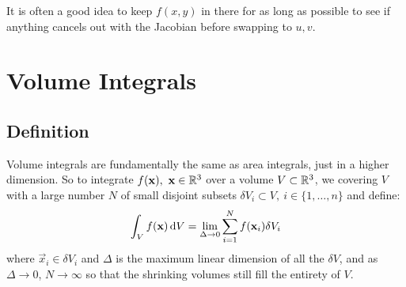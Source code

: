 \documentclass[../main.tex]{subfiles}
\begin{document}
\begin{remark}[Advice]
  It is often a good idea to keep $f(x, y)$ in there for as long as possible to see if anything cancels out with the Jacobian before swapping to $u, v$.
\end{remark}
\section{Volume Integrals}
\subsection{Definition}
Volume integrals are fundamentally the same as area integrals, just in a higher dimension.
So to integrate $f(\mathbf{\bm{x}}),\ \mathbf{\bm{x}} \in \mathbb{R}^3$ over a volume $V \subset \mathbb{R}^3$, we covering $V$ with a large number $N$ of small disjoint subsets $\delta V_i \subset V,\ i \in \{1, \ldots, n\}$ and define:
\[
  \int_{V} f(\vec{x}) \d{V} = \lim_{\Delta \to 0} \sum_{i = 1}^{N} f(\vec{x}_i)\delta V_i
\]
where $\vec{x}_i \in \delta V_i$ and $\Delta$ is the maximum linear dimension of all the $\delta V$, and as $\Delta \to 0$, $N \to \infty$ so that the shrinking volumes still fill the entirety of $V$.
\end{document}

